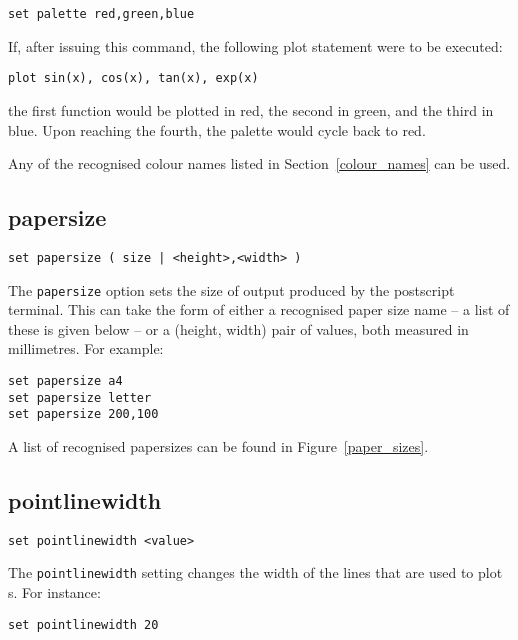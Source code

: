 \begin{verbatim}
set palette red,green,blue
\end{verbatim}

If, after issuing this command, the following plot statement were to be
executed:

\begin{verbatim}
plot sin(x), cos(x), tan(x), exp(x)
\end{verbatim}

\noindent the first function would be plotted in red, the second in green, and the third
in blue. Upon reaching the fourth, the palette would cycle back to red.

Any of the recognised colour names listed in Section~\ref{colour_names} can be used.

\subsection{papersize}

\begin{verbatim}
set papersize ( size | <height>,<width> )
\end{verbatim}

The {\tt papersize} option sets the size of output produced by the postscript
terminal. This can take the form of either a recognised paper size name -- a
list of these is given below -- or a (height, width) pair of values, both measured
in millimetres. For example:

\begin{verbatim}
set papersize a4
set papersize letter
set papersize 200,100
\end{verbatim}

A list of recognised papersizes can be found in Figure~\ref{paper_sizes}.

\subsection{pointlinewidth}

\begin{verbatim}
set pointlinewidth <value>
\end{verbatim}

The {\tt pointlinewidth} setting changes the width of the lines that are used to
plot \datapoint s.  For instance:

\begin{verbatim}
set pointlinewidth 20
\end{verbatim}

